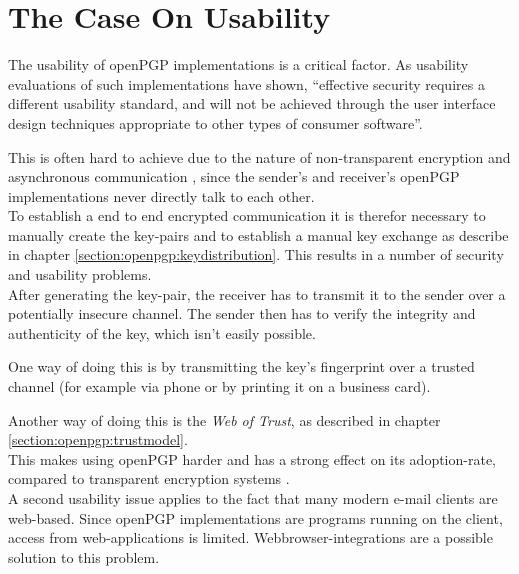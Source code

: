 
\section{The Case On Usability} \label{section:concerns:usability}


The usability of openPGP implementations is a critical factor. As usability evaluations of such implementations \cite{Whitten1999} have shown, ``effective security requires a different usability standard, and will not be achieved through the user interface design techniques appropriate to other types of consumer software''.

This is often hard to achieve due to the nature of non-transparent encryption and asynchronous communication \citep[section 2.1]{RFC4880}, since the sender's and receiver's openPGP implementations never directly talk to each other. \\

To establish a end to end encrypted communication it is therefor necessary to manually create the key-pairs and to establish a manual key exchange as describe in chapter \ref{section:openpgp:keydistribution}. This results in a number of security and usability problems.  \\


After generating the key-pair, the receiver has to transmit it to the sender over a potentially insecure channel. The sender then has to verify the integrity and authenticity of the key, which isn't easily possible.

One way of doing this is by transmitting the key's fingerprint over a trusted channel (for example via phone or by printing it on a business card). 

Another way of doing this is the \textit{Web of Trust}, as described in chapter \ref{section:openpgp:trustmodel}. \\

This makes using openPGP harder and has a strong effect on its adoption-rate, compared to transparent encryption systems \cite{Green2014}. \\

A second usability issue applies to the fact that many modern e-mail clients are web-based. Since openPGP implementations are programs running on the client, access from web-applications is limited. Webbrowser-integrations are a possible solution to this problem. 

